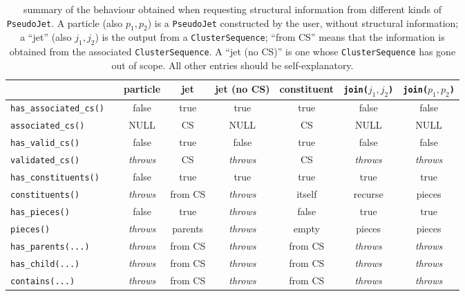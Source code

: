 \documentclass[12pt,a4]{article}
\newcommand{\ttt}[1]{{\small\texttt{#1}}}
\newcommand{\throws}{{\it throws}}
\begin{document}
\begin{table}[t]\centering
\begin{tabular}{lccccccc}
\toprule
  && particle & jet & jet (no CS) & constituent & \ttt{join(}$j_1,j_2$\ttt{)} & \ttt{join(}$p_1,p_2$\ttt{)} \\
\midrule
\ttt{has\_associated\_cs()}
                     && false   & true    &  true   & true    & false    & false   \\
\ttt{associated\_cs()}     
                     && NULL    &  CS     &  NULL   &  CS     & NULL     & NULL    \\
\midrule                       
\ttt{has\_valid\_cs()}
                     && false   & true    &  false  & true    & false    & false   \\
\ttt{validated\_cs()}&& \throws &  CS     & \throws &  CS     & \throws  & \throws \\
\midrule                       
\ttt{has\_constituents()}
                     && false   & true    & true    & true    & true     & true    \\
\ttt{constituents()} && \throws & from CS & \throws & itself  & recurse  & pieces  \\
\midrule                       
\ttt{has\_pieces()}  && false   & true    & \throws & false   & true     & true    \\ 
\ttt{pieces()}       && \throws & parents & \throws & empty   & pieces   & pieces  \\ 
\midrule                       
\ttt{has\_parents(...)}
                     && \throws & from CS & \throws & from CS & \throws  & \throws \\ 
\ttt{has\_child(...)}&& \throws & from CS & \throws & from CS & \throws  & \throws \\ 
\ttt{contains(...)}  && \throws & from CS & \throws & from CS & \throws  & \throws \\ 
\bottomrule
\end{tabular}
\caption{summary of the behaviour obtained when requesting
  structural information from different kinds of \ttt{PseudoJet}. A
  particle (also $p_1,p_2$) is a \ttt{PseudoJet}
  constructed by the user, without structural information; a ``jet''
  (also $j_1,j_2$) is the output from a
  \ttt{ClusterSequence}; ``from CS'' means that the information is
  obtained from the associated \ttt{ClusterSequence}. 
  A ``jet (no CS)'' is one whose \ttt{ClusterSequence} has gone out of
  scope.
  All other entries should be self-explanatory.}\label{tab:structure}
\end{table}
\end{document}
